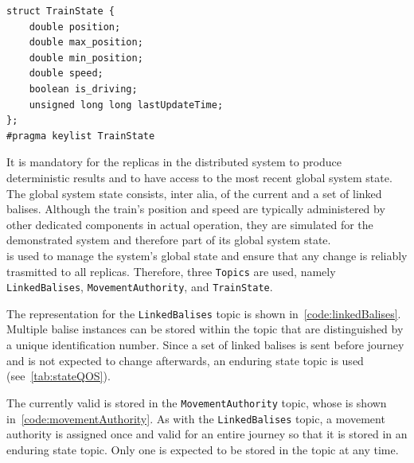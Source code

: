 \begin{lstlisting}[caption={\abr{IDL} definition for the \texttt{TrainState} topic. The train's state consists of a current position and a current speed. Due to inaccuracies of the position sensors, a train's position cannot be determined exactly. Therefore, a confidence interval is maintained that defines an area where the train certainly is. This area is bounded by \texttt{max\_position} and \texttt{min\_position}. With \texttt{is\_driving} it is encoded whether the virtual train drives or stands still. The \texttt{lastUpdateTime} variable is used to simulate the train's position based on its speed.}, label=code:trainState]
struct TrainState {
    double position;
    double max_position;
    double min_position;
    double speed;
    boolean is_driving;
    unsigned long long lastUpdateTime;
};
#pragma keylist TrainState
\end{lstlisting}

It is mandatory for the replicas in the distributed system to produce deterministic results and to have access to the most recent global system state.
The global system state consists, inter alia, of the current  and a set of linked balises.
Although the train's position and speed are typically administered by other dedicated components in actual operation, they are simulated for the demonstrated system and therefore part of its global system state.
\\

 is used to manage the system's global state and ensure that any change is reliably trasmitted to all replicas.
Therefore, three \texttt{Topics} are used, namely \texttt{LinkedBalises}, \texttt{MovementAuthority}, and \texttt{TrainState}.

The  representation for the \texttt{LinkedBalises} topic is shown in~\autoref{code:linkedBalises}.
Multiple balise instances can be stored within the topic that are distinguished by a unique identification number.
Since a set of linked balises is sent before journey and is not expected to change afterwards, an enduring  state topic is used (see~\autoref{tab:stateQOS}).

The currently valid  is stored in the \texttt{MovementAuthority} topic, whose  is shown in~\autoref{code:movementAuthority}.
As with the \texttt{LinkedBalises} topic, a movement authority is assigned once and valid for an entire journey so that it is stored in an enduring state topic.
Only one  is expected to be stored in the topic at any time.

